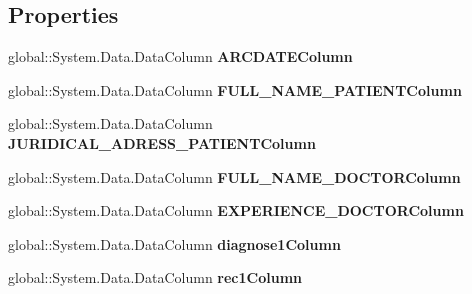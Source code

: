 \subsection*{Properties}
\begin{CompactItemize}
\item 
global::System.Data.DataColumn \textbf{ARCDATEColumn}\hspace{0.3cm}{\tt  [get]}\label{class_automatic_medical_system_1_1_data_set1_1_1_r_e_p_o_r_t_f_a_m_i_l_y_d_o_c_t_o_r_s_data_table_036ebed0481f7064a3ae95a55d1df805}

\item 
global::System.Data.DataColumn \textbf{FULL\_\-NAME\_\-PATIENTColumn}\hspace{0.3cm}{\tt  [get]}\label{class_automatic_medical_system_1_1_data_set1_1_1_r_e_p_o_r_t_f_a_m_i_l_y_d_o_c_t_o_r_s_data_table_10b28563b09b8974f9a56ab39b7a341d}

\item 
global::System.Data.DataColumn \textbf{JURIDICAL\_\-ADRESS\_\-PATIENTColumn}\hspace{0.3cm}{\tt  [get]}\label{class_automatic_medical_system_1_1_data_set1_1_1_r_e_p_o_r_t_f_a_m_i_l_y_d_o_c_t_o_r_s_data_table_f6cf4ddfc8fd0020f81e3195d7d93f06}

\item 
global::System.Data.DataColumn \textbf{FULL\_\-NAME\_\-DOCTORColumn}\hspace{0.3cm}{\tt  [get]}\label{class_automatic_medical_system_1_1_data_set1_1_1_r_e_p_o_r_t_f_a_m_i_l_y_d_o_c_t_o_r_s_data_table_6f0d459670f2764abdb3035a621747d8}

\item 
global::System.Data.DataColumn \textbf{EXPERIENCE\_\-DOCTORColumn}\hspace{0.3cm}{\tt  [get]}\label{class_automatic_medical_system_1_1_data_set1_1_1_r_e_p_o_r_t_f_a_m_i_l_y_d_o_c_t_o_r_s_data_table_686814c606bc52f570fd902b784a9bdc}

\item 
global::System.Data.DataColumn \textbf{diagnose1Column}\hspace{0.3cm}{\tt  [get]}\label{class_automatic_medical_system_1_1_data_set1_1_1_r_e_p_o_r_t_f_a_m_i_l_y_d_o_c_t_o_r_s_data_table_9c079a2fd5b9240c5a3f6571845c3e58}

\item 
global::System.Data.DataColumn \textbf{rec1Column}\hspace{0.3cm}{\tt  [get]}\label{class_automatic_medical_system_1_1_data_set1_1_1_r_e_p_o_r_t_f_a_m_i_l_y_d_o_c_t_o_r_s_data_table_5abcde12d01f614c6ec0fcc49267bfdb}


\end{CompactItemize}
